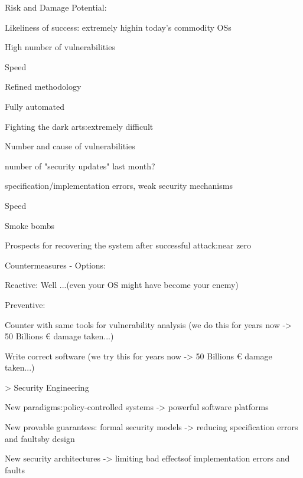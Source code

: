 \documentclass[a4paper]{article}
\begin{document}
\begin{multicols}{3}
    Risk and Damage Potential:
    \begin{itemize*}
        \item Likeliness of success: extremely highin today’s commodity OSs
              \begin{itemize*}
                  \item High number of vulnerabilities
                  \item Speed
                  \item Refined methodology
                  \item Fully automated
              \end{itemize*}
        \item Fighting the dark arts:extremely difficult
              \begin{itemize*}
                  \item Number and cause of vulnerabilities
                  \item number of "security updates" last month?
                  \item specification/implementation errors, weak security mechanisms
                  \item Speed
                  \item Smoke bombs
              \end{itemize*}
        \item Prospects for recovering the system after successful attack:near zero
    \end{itemize*}

    Countermeasures - Options:
    \begin{itemize*}
        \item Reactive: Well ...(even your OS might have become your enemy)
        \item Preventive:
              \begin{itemize*}
                  \item Counter with same tools for vulnerability analysis (we do this for years now ->  50 Billions € damage taken...)
                  \item Write correct software (we try this for years now ->  50 Billions € damage taken...)
              \end{itemize*}
    \end{itemize*}

    > Security Engineering
    \begin{itemize*}
        \item New paradigms:policy-controlled systems ->  powerful software platforms
        \item New provable guarantees: formal security models ->  reducing specification errors and faultsby design
        \item New security architectures -> limiting bad effectsof implementation errors and faults
    \end{itemize*}


\end{multicols}
\end{document}
